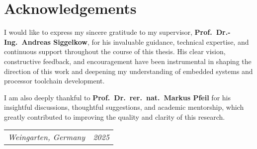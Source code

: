 \chapter*{Acknowledgements}

I would like to express my sincere gratitude to my supervisor, \textbf{Prof.\ Dr.-Ing.\ Andreas Siggelkow}, for his invaluable guidance, technical expertise, and continuous support throughout the course of this thesis. His clear vision, constructive feedback, and encouragement have been instrumental in shaping the direction of this work and deepening my understanding of embedded systems and processor toolchain development.

I am also deeply thankful to \textbf{Prof.\ Dr.\ rer.\ nat.\ Markus Pfeil} for his insightful discussions, thoughtful suggestions, and academic mentorship, which greatly contributed to improving the quality and clarity of this research.

\vspace{10.5cm}

\noindent
\begin{tabular}{@{}p{}p{}@{}}
\textit{Weingarten, Germany} & \hfill \textit{2025} \\
\end{tabular}

\clearpage

